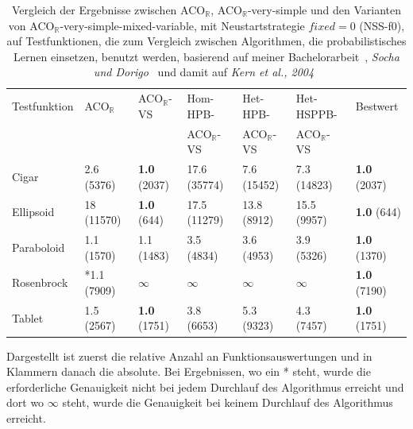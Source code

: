 \documentclass[fontsize=12, a4aper]{scrartcl}
\begin{document}
	\begin{table}[H]
		
		\caption{Vergleich der Ergebnisse zwischen ACO\(_{\mathbb{R}}\), ACO\(_{\mathbb{R}}\)-very-simple und den Varianten von ACO\(_{\mathbb{R}}\)-very-simple-mixed-variable, mit Neustartstrategie \(fixed = 0\) (NSS-f0), auf Testfunktionen, die zum Vergleich zwischen Algorithmen, die probabilistisches Lernen einsetzen, benutzt werden, basierend auf meiner Bachelorarbeit~\cite{FCM_2019}, \textit{Socha und Dorigo}~\cite{socha2008ant} und damit auf \textit{Kern et al., 2004}~\cite{kern2004learning}}
		
		\label{subsec:Vergleich_Von_ACO_R_ACO_R_Very_Simple_Und_Iterationen:tab:Vergleich_Probabilistisches_Lernen_Teil_2}
		
		\scriptsize
		
		\begin{tabularx}{\linewidth}{X X X X X X X}
			
			\toprule
			
			Testfunktion & ACO\(_{\mathbb{R}}\) & ACO\(_{\mathbb{R}}\)-VS & Hom-HPB- & Het-HPB- & Het-HSPPB- & Bestwert\\
			 			 &						&						  & ACO\(_\mathbb{R}\)-VS & ACO\(_\mathbb{R}\)-VS & ACO\(_\mathbb{R}\)-VS & \\
			
			\midrule
			
			Cigar & 2.6 (5376) & \textbf{1.0} (2037) & 17.6 (35774) & 7.6 (15452) & 7.3 (14823) & \textbf{1.0} (2037)\\
			
			Ellipsoid & 18 (11570) & \textbf{1.0} (644) & 17.5 (11279) & 13.8 (8912) & 15.5 (9957) & \textbf{1.0} (644)\\
			
			Paraboloid & 1.1 (1570) & 1.1 (1483) & 3.5 (4834) & 3.6 (4953) & 3.9 (5326) & \textbf{1.0} (1370)\\
			
			Rosenbrock & *1.1 (7909) & \(\infty\) & \(\infty\) & \(\infty\) & \(\infty\) & \textbf{1.0} (7190)\\
			
			Tablet & 1.5 (2567) & \textbf{1.0} (1751) & 3.8 (6653) & 5.3 (9323) & 4.3 (7457) & \textbf{1.0} (1751)\\
			
			\bottomrule
			
		\end{tabularx}
		
		\smallskip
		
		Dargestellt ist zuerst die relative Anzahl an Funktionsauswertungen und in Klammern danach die absolute. Bei Ergebnissen, wo ein * steht, wurde die erforderliche Genauigkeit nicht bei jedem Durchlauf des Algorithmus erreicht und dort wo \(\infty\) steht, wurde die Genauigkeit bei keinem Durchlauf des Algorithmus erreicht.\hfill\newline
		
	\end{table}
	
\end{document}
